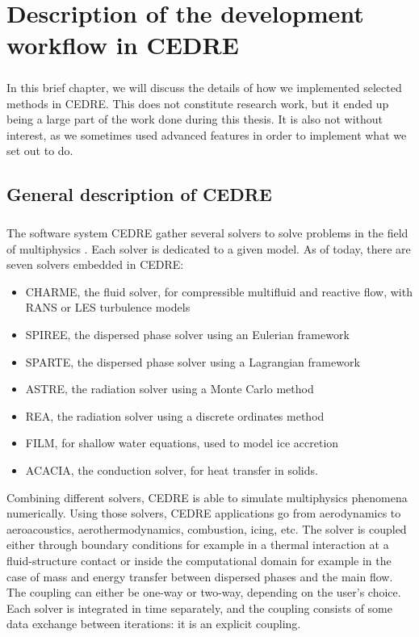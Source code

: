 \chapter{Description of the development workflow in CEDRE}

  \paragraph{}
  In this brief chapter, we will discuss the details of how we implemented selected methods in CEDRE.
  This does not constitute research work, but it ended up being a large part of the work done during this thesis.
  It is also not without interest, as we sometimes used advanced features in order to implement what we set out to do.


  \section{General description of CEDRE}

    \paragraph{}
    The software system CEDRE gather several solvers to solve problems in the field of multiphysics \cite{ReflochCourbetMurroneEtAl2011}.
    Each solver is dedicated to a given model.
    As of today, there are seven solvers embedded in CEDRE:
    \begin{itemize}
      \item CHARME, the fluid solver, for compressible multifluid and reactive flow, with RANS or LES turbulence models
      \item SPIREE, the dispersed phase solver using an Eulerian framework
      \item SPARTE, the dispersed phase solver using a Lagrangian framework
      \item ASTRE, the radiation solver using a Monte Carlo method
      \item REA, the radiation solver using a discrete ordinates method
      \item FILM, for shallow water equations, used to model ice accretion
      \item ACACIA, the conduction solver, for heat transfer in solids.
    \end{itemize}
    Combining different solvers, CEDRE is able to simulate multiphysics phenomena numerically.
    Using those solvers, CEDRE applications go from aerodynamics to aeroacoustics, aerothermodynamics, combustion, icing, etc.
    The solver is coupled either through boundary conditions for example in a thermal interaction at a fluid-structure contact or inside the computational domain for example in the case of mass and energy transfer between dispersed phases and the main flow.
    The coupling can either be one-way or two-way, depending on the user's choice.
    Each solver is integrated in time separately, and the coupling consists of some data exchange between iterations: it is an explicit coupling.

